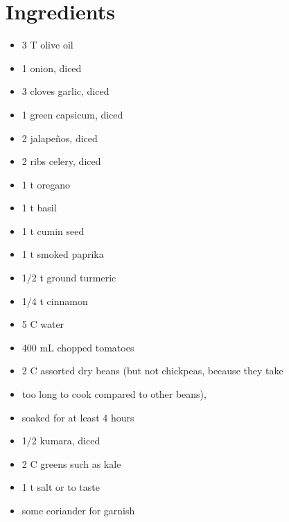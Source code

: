 \documentclass[letterpaper,10pt,english]{sphinxmanual}
\begin{document}
\section{Ingredients}
\label{chili:ingredients}\begin{itemize}
\item {} 
3   T   olive oil

\item {} 
1       onion, diced

\item {} 
3       cloves garlic, diced

\item {} 
1       green capsicum, diced

\item {} 
2       jalapeños, diced

\item {} 
2       ribs celery, diced

\item {} 
1   t   oregano

\item {} 
1   t   basil

\item {} 
1   t   cumin seed

\item {} 
1   t   smoked paprika

\item {} 
1/2 t   ground turmeric

\item {} 
1/4 t   cinnamon

\item {} 
5   C   water

\item {} 
400 mL  chopped tomatoes

\item {} 
2   C   assorted dry beans (but not chickpeas, because they take

\item {} 
too long to cook compared to other beans),

\item {} 
soaked for at least 4 hours

\item {} 
1/2     kumara, diced

\item {} 
2   C   greens such as kale

\item {} 
1   t   salt or to taste

\item {} 
some        coriander for garnish

\end{itemize}
\end{document}

